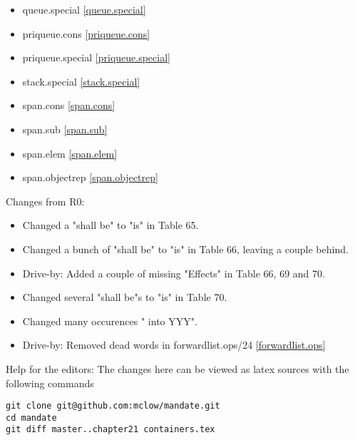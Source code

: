\begin{multicols}{2}
\begin{itemize}
\item{queue.special     \ref{queue.special}}
\item{priqueue.cons     \ref{priqueue.cons}}
\item{priqueue.special  \ref{priqueue.special}}
\item{stack.special     \ref{stack.special}}
\item{span.cons         \ref{span.cons}}

\item{span.sub        \ref{span.sub}}
\item{span.elem       \ref{span.elem}}
\item{span.objectrep  \ref{span.objectrep}}
\end{itemize}
\end{multicols}

Changes from R0:
\begin{itemize}
\item{Changed a "shall be" to "is" in Table 65.}
\item{Changed a bunch of "shall be" to "is" in Table 66, leaving a couple behind.}
\item{Drive-by: Added a couple of missing "Effects" in Table 66, 69 and 70.}
\item{Changed several "shall be"s to "is" in Table 70.}
\item{Changed many occurences "  into YYY".}
\item{Drive-by: Removed dead words in forwardlist.ops/24 \ref{forwardlist.ops}}
\end{itemize}

\vfill
Help for the editors: The changes here can be viewed as latex sources with the following commands
\begin{verbatim}
git clone git@github.com:mclow/mandate.git
cd mandate
git diff master..chapter21 containers.tex
\end{verbatim}
\newpage
